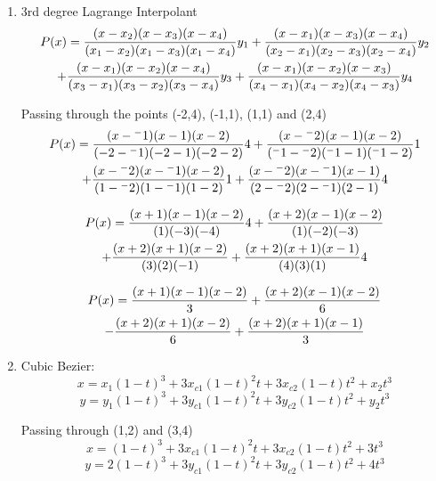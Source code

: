 \documentclass{article}
\begin{document}
\begin{enumerate}
\item 3rd degree Lagrange Interpolant
\begin{multline}
P(x) = \frac{(x - x_2)(x - x_3)(x - x_4)}{(x_1-x_2)(x_1-x_3)(x_1-x_4)}y_1
        + \frac{(x - x_1)(x - x_3)(x - x_4)}{(x_2-x_1)(x_2-x_3)(x_2-x_4)}y_2 \\
        + \frac{(x - x_1)(x - x_2)(x - x_4)}{(x_3-x_1)(x_3-x_2)(x_3-x_4)}y_3
        + \frac{(x - x_1)(x - x_2)(x - x_3)}{(x_4-x_1)(x_4-x_2)(x_4-x_3)}y_4
\notag
\end{multline}

Passing through the points (-2,4), (-1,1), (1,1) and (2,4)
\begin{multline}
P(x) = \frac{(x - {^-}1)(x - 1)(x - 2)}{(-2-{^-}1)(-2-1)(-2-2)}4
        + \frac{(x -  {^-}2)(x - 1)(x - 2)}{( {^-}1- {^-}2)( {^-}1- 1)( {^-}1-2)}1 \\
        + \frac{(x - {^-}2)(x - {^-}1)(x - 2)}{(1-{^-}2)(1-{^-}1)(1-2)}1
        + \frac{(x - {^-}2)(x - {^-}1)(x -1)}{(2-{^-}2)(2-{^-}1)(2-1)}4
\notag
\end{multline}

\begin{multline}
P(x) = \frac{(x + 1)(x - 1)(x - 2)}{(1)(-3)(-4)}4
        + \frac{(x + 2)(x - 1)(x - 2)}{( 1)(-2)(-3)} \\
        + \frac{(x + 2)(x + 1)(x - 2)}{(3)(2)(-1)}
        + \frac{(x + 2)(x + 1)(x -1)}{(4)(3)(1)}4
\notag
\end{multline}

\begin{multline}
P(x) = \frac{(x + 1)(x - 1)(x - 2)}{3}
        + \frac{(x + 2)(x - 1)(x - 2)}{6} \\
        - \frac{(x + 2)(x + 1)(x - 2)}{6}
        + \frac{(x + 2)(x + 1)(x -1)}{3}
\notag
\end{multline}

\item Cubic Bezier:
\[
x = x_1(1-t)^3 + 3x_{c1}(1-t)^2t + 3x_{c2}(1-t)t^2 + x_2t^3
\]
\[
y = y_1(1-t)^3 + 3y_{c1}(1-t)^2t + 3y_{c2}(1-t)t^2 + y_2t^3
\]

Passing through (1,2) and (3,4)
\[
x = (1-t)^3 + 3x_{c1}(1-t)^2t + 3x_{c2}(1-t)t^2 + 3t^3
\]
\[
y = 2(1-t)^3 + 3y_{c1}(1-t)^2t + 3y_{c2}(1-t)t^2 + 4t^3
\]


\end{enumerate}
\end{document}

